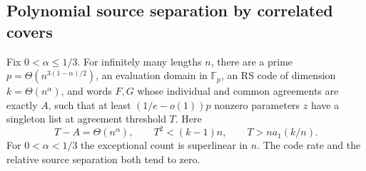 \subsection{Polynomial source separation by correlated covers}
\label{subsec:correlated-cover-line}

\begin{theorem}\label{thm:correlated-cover-line}
Fix $0<\alpha\le1/3$. For infinitely many lengths $n$, there are a prime
$p=\Theta(n^{3(1-\alpha)/2})$, an evaluation domain in $\mathbb F_p$,
an RS code of dimension $k=\Theta(n^\alpha)$, and words $F,G$ whose
individual and common agreements are exactly $A$, such that at least
$(1/e-o(1))p$ nonzero parameters $z$ have a singleton list at agreement
threshold $T$. Here
\[
 T-A=\Theta(n^\alpha),\qquad T^2<(k-1)n,\qquad T>n a_1(k/n).
\]
For $0<\alpha<1/3$ the exceptional count is superlinear in $n$.
The code rate and the relative source separation both tend to zero.
\end{theorem}

